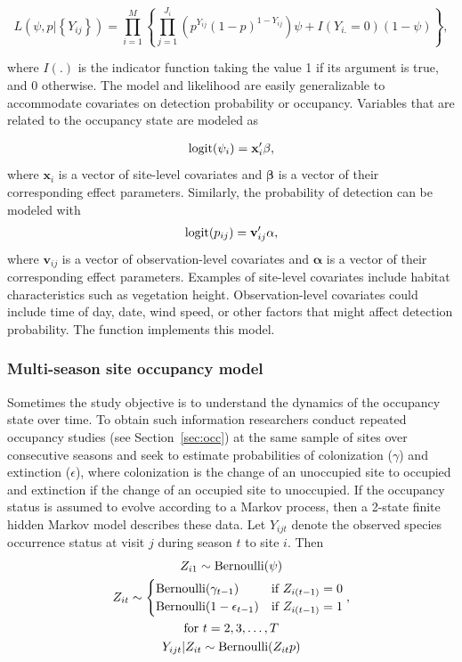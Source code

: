 \documentclass[article,shortnames]{jss}
\DeclareMathOperator{\logit}{logit}
\DeclareMathOperator{\Bern}{Bernoulli}
\begin{document}
\begin{equation}
L(\psi, p | \left\{Y_{ij}\right\}) =
 \prod_{i=1}^{M} \left\{
    \prod_{j=1}^{J_i}
      \left(p^{Y_{ij}}(1-p)^{1-Y_{ij}}\right)
          \psi + I(Y_{i.}=0)(1-\psi) \right\},
\end{equation}

where $I(.)$ is the indicator function taking the value 1 if its argument is
true, and 0 otherwise. The model and likelihood are easily generalizable to
accommodate covariates on detection probability or occupancy.
Variables that are related to the occupancy state are modeled as

\begin{gather}
  \logit(\psi_i) = \mathbf x_i' \mathbf \beta, \notag
\end{gather}
where $\mathbf x_i$ is a vector of site-level covariates and $\mathbf \beta$
is a vector of their corresponding effect parameters.  Similarly, the
probability of detection can be modeled with
\begin{gather}
  \logit(p_{ij}) = \mathbf v_{ij}' \mathbf \alpha, \notag
\end{gather}
where $\mathbf v_{ij}$ is a vector of observation-level covariates and
$\mathbf \alpha$ is a vector of their corresponding effect parameters.
Examples of site-level covariates include habitat characteristics such as
vegetation height. Observation-level covariates could include time of day,
date, wind speed, or other factors that might affect detection probability.
The function  implements this model.


\subsubsection{Multi-season site occupancy model}

Sometimes the study objective is to understand the dynamics of the
occupancy state over time. To obtain such information researchers conduct
repeated occupancy studies (see Section~\ref{sec:occ}) at the same sample of
sites over consecutive seasons \citep{MacKenzie2003} and seek to estimate
probabilities of colonization ($\gamma$) and extinction
($\epsilon$), where colonization is the change of an unoccupied
site to occupied and extinction if the change of an occupied site to
unoccupied.  If the occupancy status is assumed to evolve according to
a Markov process, then a 2-state finite hidden Markov model describes
these data.  Let $Y_{ijt}$ denote the observed species occurrence
status at visit $j$ during season $t$ to site $i$.  Then
\begin{gather}
  Z_{i1} \sim \Bern(\psi) \notag \\
  Z_{it} \sim
  \begin{cases}
    \Bern(\gamma_{t-1}) & \text{if $Z_{i(t-1)} = 0$} \notag \\
    \Bern(1-\epsilon_{t-1}) & \text{if $Z_{i(t-1)} = 1$}
  \end{cases}, \\
  \text{for $t=2,3,\dots,T$} \notag \\
  Y_{ijt} | Z_{it} \sim \Bern(Z_{it} p) \notag
\end{gather}
\end{document}
